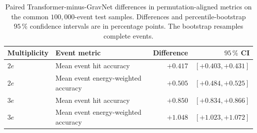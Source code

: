 \begin{table}[htbp]
    \centering
    \small
    \setlength{\tabcolsep}{7pt}
    \caption{Paired Transformer-minus-GravNet differences in
    permutation-aligned metrics on the common \(100{,}000\)-event test
    samples. Differences and percentile-bootstrap \(95\,\%\) confidence
    intervals are in percentage points. The bootstrap resamples complete
    events.}
    \label{tab:results_baseline_paired}
    \begin{tabular}{llrr}
        \hline
        Multiplicity & Event metric & Difference & \(95\,\%\) CI \\
        \hline
        \(2e\) & Mean event hit accuracy & \(+0.417\) & \([+0.403,+0.431]\) \\
        \(2e\) & Mean event energy-weighted accuracy & \(+0.505\) & \([+0.484,+0.525]\) \\
        \(3e\) & Mean event hit accuracy & \(+0.850\) & \([+0.834,+0.866]\) \\
        \(3e\) & Mean event energy-weighted accuracy & \(+1.048\) & \([+1.023,+1.072]\) \\
        \hline
    \end{tabular}
\end{table}
